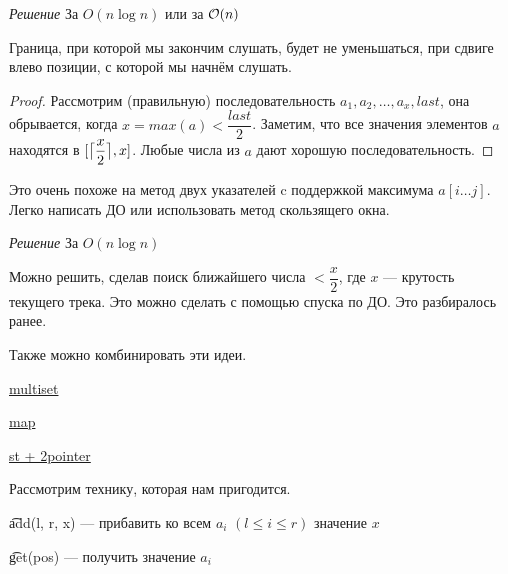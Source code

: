 {\it Решение } За $O(n \log n)$ или за $\mathcal{O}(n)$ \href{https://codeforces.com/contest/1237/submission/62704110}{}

\begin{Prop}Граница, при которой мы закончим слушать, будет не уменьшаться, при сдвиге влево позиции, с которой мы начнём слушать.\end{Prop}

\begin{proof}
	Рассмотрим (правильную) последовательность $a_1, a_2, \ldots, a_x, last$, она обрывается, когда $x=max(a) < \dfrac{last}{2}$. Заметим, что все значения элементов $a$ находятся в $[\ceil[\big]{\dfrac{x}{2}}, x]$. Любые числа из $a$ дают хорошую последовательность.
\end{proof}

Это очень похоже на метод двух указателей c поддержкой максимума $a[i \ldots j]$. Легко написать ДО или использовать метод скользящего окна.

\down

{\it Решение } За $O(n \log n)$
\href{https://codeforces.com/contest/1237/submission/62700019}{}

Можно решить, сделав поиск ближайшего числа $< \dfrac{x}{2}$, где $x$ --- крутость текущего трека. Это можно сделать с помощью спуска по ДО. Это разбиралось ранее. 

Также можно комбинировать эти идеи.

\href{https://codeforces.com/contest/1237/submission/62700598}{multiset }

\href{https://codeforces.com/contest/1237/submission/62695687}{map }

\href{https://codeforces.com/contest/1237/submission/62712896}{st + 2pointer }

\pagebreak


Рассмотрим технику, которая нам пригодится.

\begin{MyList}[0pt]
	\item \t{add(l, r, x)} --- прибавить ко всем $a_i$ $(l \le i \le r)$ значение $x$
	\item \t{get(pos)} --- получить значение $a_i$
\end{MyList}
\up \up


